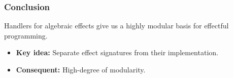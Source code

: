 


\begin{frame}
  \frametitle{Conclusion}
  \begin{center}
    Handlers for algebraic effects give us a highly modular basis for effectful programming.
  \end{center}
\begin{itemize}
  \item \textbf{Key idea:} Separate effect signatures from their implementation.
  \item \textbf{Consequent:} High-degree of modularity.
\end{itemize}
\end{frame}
